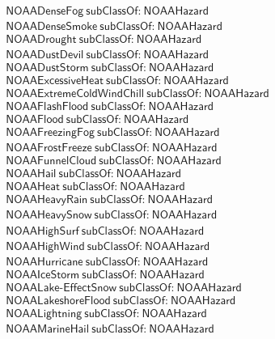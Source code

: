 \begin{align}
  \textsf{NOAADenseFog}~\textsf{subClassOf:}~\textsf{NOAAHazard}\\
  \textsf{NOAADenseSmoke}~\textsf{subClassOf:}~\textsf{NOAAHazard}\\
  \textsf{NOAADrought}~\textsf{subClassOf:}~\textsf{NOAAHazard}\\
  \textsf{NOAADustDevil}~\textsf{subClassOf:}~\textsf{NOAAHazard}\\
  \textsf{NOAADustStorm}~\textsf{subClassOf:}~\textsf{NOAAHazard}\\
  \textsf{NOAAExcessiveHeat}~\textsf{subClassOf:}~\textsf{NOAAHazard}\\
  \textsf{NOAAExtremeColdWindChill}~\textsf{subClassOf:}~\textsf{NOAAHazard}\\
  \textsf{NOAAFlashFlood}~\textsf{subClassOf:}~\textsf{NOAAHazard}\\
  \textsf{NOAAFlood}~\textsf{subClassOf:}~\textsf{NOAAHazard}\\
  \textsf{NOAAFreezingFog}~\textsf{subClassOf:}~\textsf{NOAAHazard}\\
  \textsf{NOAAFrostFreeze}~\textsf{subClassOf:}~\textsf{NOAAHazard}\\
  \textsf{NOAAFunnelCloud}~\textsf{subClassOf:}~\textsf{NOAAHazard}\\
  \textsf{NOAAHail}~\textsf{subClassOf:}~\textsf{NOAAHazard}\\
  \textsf{NOAAHeat}~\textsf{subClassOf:}~\textsf{NOAAHazard}\\
  \textsf{NOAAHeavyRain}~\textsf{subClassOf:}~\textsf{NOAAHazard}\\
  \textsf{NOAAHeavySnow}~\textsf{subClassOf:}~\textsf{NOAAHazard}\\
  \textsf{NOAAHighSurf}~\textsf{subClassOf:}~\textsf{NOAAHazard}\\
  \textsf{NOAAHighWind}~\textsf{subClassOf:}~\textsf{NOAAHazard}\\
  \textsf{NOAAHurricane}~\textsf{subClassOf:}~\textsf{NOAAHazard}\\
  \textsf{NOAAIceStorm}~\textsf{subClassOf:}~\textsf{NOAAHazard}\\
  \textsf{NOAALake-EffectSnow}~\textsf{subClassOf:}~\textsf{NOAAHazard}\\
  \textsf{NOAALakeshoreFlood}~\textsf{subClassOf:}~\textsf{NOAAHazard}\\
  \textsf{NOAALightning}~\textsf{subClassOf:}~\textsf{NOAAHazard}\\
  \textsf{NOAAMarineHail}~\textsf{subClassOf:}~\textsf{NOAAHazard}\\

\end{align}

